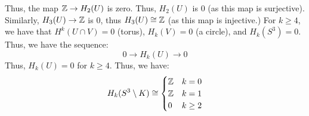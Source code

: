 \documentclass[12pt]{article}
\begin{document}
\begin{solution}
\begin{enumerate}
        Thus, the map $\mathbb Z \to H_2(U)$ is zero. Thus, $H_2(U)$ is $0$ (as this map is surjective). Similarly, $H_3(U) \to \mathbb Z$ is $0$, thus $H_3(U) \cong \mathbb Z$ (as this map is injective.) \bbni
        For $k \geq 4$, we have that $H^k(U\cap V) = 0$ (torus), $H_k(V) = 0$ (a circle), and $H_k(S^3) = 0$. Thus, we have the sequence:
        \[  0 \to H_k(U) \to 0\]
        Thus, $H_k(U) = 0$ for $k \geq 4$. \bbni
        Thus, we have:
        \[ H_k(S^3 \setminus K) \cong \begin{cases} \mathbb Z & k = 0 \\ \mathbb Z & k = 1 \\ 0 & k \geq 2 \end{cases} \]
    \end{enumerate}
\end{solution}
\newpage
\end{document}
